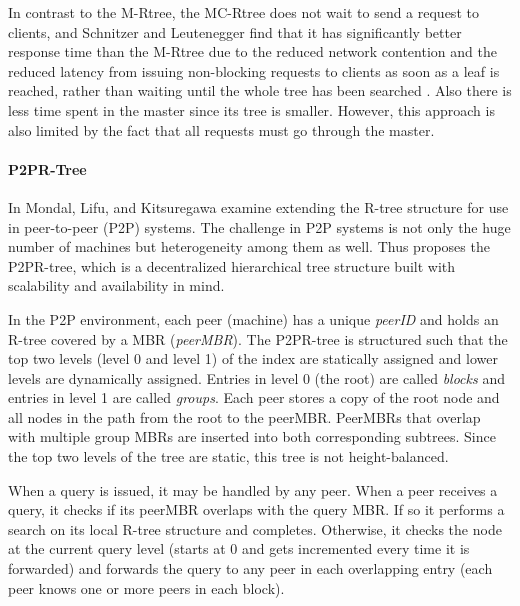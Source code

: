 In contrast to the M-Rtree, the MC-Rtree does not wait to send a request to
clients, and Schnitzer and Leutenegger find that it has significantly better 
response time than the M-Rtree due to the reduced network contention and the 
reduced latency from issuing non-blocking requests to clients as soon as a leaf 
is reached, rather than waiting until the whole tree has been searched  
\cite{schnitzer1999master}. Also there is less time spent in the master since its 
tree is smaller. However, this approach is also limited by the fact that all 
requests must go through the master.



\paragraph{P2PR-Tree}
In \cite{mondal2005p2pr} Mondal, Lifu, and Kitsuregawa examine extending the 
R-tree structure for use in peer-to-peer (P2P) systems. The challenge in P2P 
systems is not only the huge number of machines but heterogeneity among them as 
well. Thus \cite{mondal2005p2pr} proposes the P2PR-tree, which is a 
decentralized hierarchical tree structure built with scalability and availability
in mind. 

In the P2P environment, each peer (machine) has a unique \emph{peerID} and holds
an R-tree covered by a MBR (\emph{peerMBR}). The P2PR-tree is structured
such that the top two levels (level 0 and level 1) of the index are statically 
assigned and lower levels are dynamically assigned. Entries in level 0 (the root)
are called \emph{blocks} and entries in level 1 are called \emph{groups}. Each 
peer stores a copy of the root node and all nodes in the path from the root to 
the peerMBR. PeerMBRs that overlap with multiple group MBRs are inserted into 
both corresponding subtrees. Since the top two levels of the tree are static, 
this tree is not height-balanced\cite{mondal2005p2pr}.

When a query is issued, it may be handled by any peer. When a peer receives a 
query, it checks if its peerMBR overlaps with the query MBR. If so it performs 
a search on its local R-tree structure and completes. Otherwise, it checks the 
node at the current query level (starts at 0 and gets incremented every time it
is forwarded) and forwards the query to any peer in each overlapping entry (each
peer knows one or more peers in each block).

